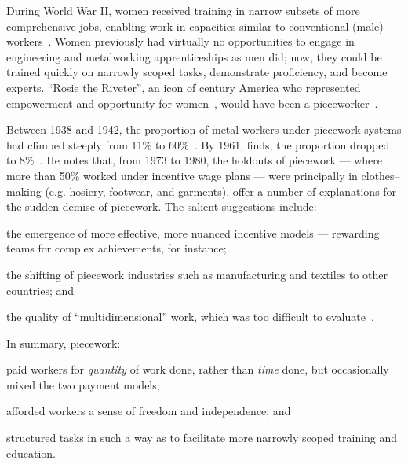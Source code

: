 \documentclass[trackingWork]{subfiles}
\begin{document}
During World War II, women received training in narrow subsets of more comprehensive jobs, enabling work in capacities similar to conventional (male) workers~\cite{hart2013rise}.
Women previously had virtually no opportunities
to engage in engineering and metalworking apprenticeships as men did;
now, they
could be trained quickly on narrowly scoped tasks,
demonstrate proficiency, and become experts.
``Rosie the Riveter'',
an icon of  century America who
represented empowerment and opportunity for women~\cite{honey1985creating},
would have been a pieceworker~\cite{davies2014origins}.

Between 1938 and 1942, the proportion of metal workers under piecework systems had climbed steeply from 11\% to 60\%~\cite{hart2005piecework}.
By 1961, \citeauthor{carlson1982time} finds, the proportion dropped to 8\%~\cite{carlson1982time}.
He notes that, from 1973 to 1980, the holdouts of piecework
--- where more than 50\% worked under incentive wage plans ---
were principally in clothes--making (e.g. hosiery, footwear, and garments).
\citeauthor{hart2013rise} offer a number of explanations for the sudden demise of piecework.
The salient suggestions include:
\begin{inlinelist}
\item the emergence of more effective, more nuanced incentive models
--- rewarding teams for complex achievements, for instance;
\item the shifting of piecework industries such as manufacturing and textiles to other countries; and
\item the quality of ``multidimensional'' work, which was too difficult to evaluate~\cite{hart2013rise}.
\end{inlinelist}



In summary, piecework:
\begin{inlinelist}
  \item paid workers for \textit{quantity} of work done, rather than \textit{time} done,
        but occasionally mixed the two payment models;
  \item afforded workers a sense of freedom and independence; and
  \item structured tasks in such a way as to facilitate more narrowly scoped training and education.
\end{inlinelist}
\end{document}
